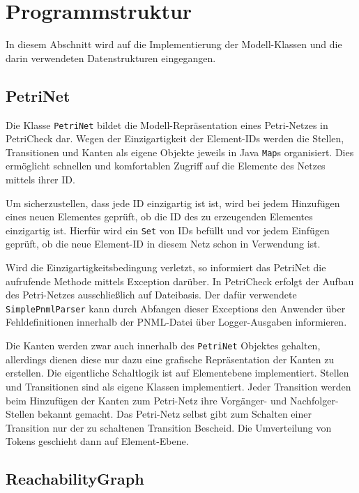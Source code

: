 \section{Programmstruktur}
\label{sec:struct}

In diesem Abschnitt wird auf die Implementierung der Modell-Klassen und die
darin verwendeten Datenstrukturen eingegangen.

\subsection{PetriNet}

Die Klasse \texttt{PetriNet} bildet die Modell-Repräsentation eines Petri-Netzes
in PetriCheck dar. Wegen der Einzigartigkeit der Element-IDs werden die Stellen,
Transitionen und Kanten als eigene Objekte jeweils in Java \texttt{Map}s
organisiert. Dies ermöglicht schnellen und komfortablen Zugriff auf die Elemente
des Netzes mittels ihrer ID.

Um sicherzustellen, dass jede ID einzigartig ist ist, wird bei jedem Hinzufügen
eines neuen Elementes geprüft, ob die ID des zu erzeugenden Elementes
einzigartig ist. Hierfür wird ein \texttt{Set} von IDs befüllt und vor jedem
Einfügen geprüft, ob die neue Element-ID in diesem Netz schon in Verwendung ist.

Wird die Einzigartigkeitsbedingung verletzt, so informiert das PetriNet die
aufrufende Methode mittels Exception darüber. In PetriCheck erfolgt der Aufbau
des Petri-Netzes ausschließlich auf Dateibasis. Der dafür verwendete
\texttt{SimplePnmlParser} kann durch Abfangen dieser Exceptions den Anwender
über Fehldefinitionen innerhalb der PNML-Datei über Logger-Ausgaben informieren.

Die Kanten werden zwar auch innerhalb des \texttt{PetriNet} Objektes gehalten,
allerdings dienen diese nur dazu eine grafische Repräsentation der Kanten zu
erstellen. Die eigentliche Schaltlogik ist auf Elementebene implementiert.
Stellen und Transitionen sind als eigene Klassen implementiert. Jeder Transition
werden beim Hinzufügen der Kanten zum Petri-Netz ihre Vorgänger- und
Nachfolger-Stellen bekannt gemacht. Das Petri-Netz selbst gibt zum Schalten
einer Transition nur der zu schaltenen Transition Bescheid. Die Umverteilung von
Tokens geschieht dann auf Element-Ebene.

\subsection{ReachabilityGraph}

